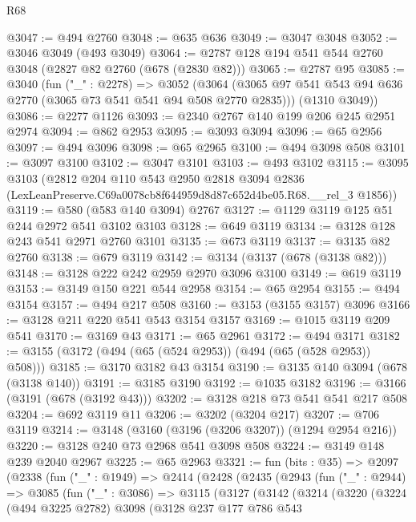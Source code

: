 \begin{lexlean}{R68}
\begin{coremodule}
@3047 := @494 @2760
@3048 := @635 @636
@3049 := @3047 @3048
@3052 := @3046 @3049 (@493 @3049)
@3064 := @2787 @128 @194 @541 @544 @2760 @3048 (@2827 @82 @2760 (@678 (@2830 @82)))
@3065 := @2787 @95
@3085 := @3040
    (fun ("_" : @2278) =>
    @3052
      (@3064 (@3065 @97 @541 @543 @94 @636 @2770 (@3065 @73 @541 @541 @94 @508 @2770 @2835)))
      (@1310 @3049))
@3086 := @2277 @1126
@3093 := @2340 @2767 @140 @199 @206 @245 @2951 @2974
@3094 := @862 @2953
@3095 := @3093 @3094
@3096 := @65 @2956
@3097 := @494 @3096
@3098 := @65 @2965
@3100 := @494 @3098 @508
@3101 := @3097 @3100
@3102 := @3047 @3101
@3103 := @493 @3102
@3115 := @3095
    @3103
    (@2812
      @204
      @110
      @543
      @2950
      @2818
      @3094
      @2836
      (LexLeanPreserve.C69a0078cb8f644959d8d87c652d4be05.R68.__rel_3 @1856))
@3119 := @580 (@583 @140 @3094) @2767
@3127 := @1129 @3119 @125 @51 @244 @2972 @541 @3102 @3103
@3128 := @649 @3119
@3134 := @3128 @128 @243 @541 @2971 @2760 @3101
@3135 := @673 @3119
@3137 := @3135 @82 @2760
@3138 := @679 @3119
@3142 := @3134 (@3137 (@678 (@3138 @82)))
@3148 := @3128 @222 @242 @2959 @2970 @3096 @3100
@3149 := @619 @3119
@3153 := @3149 @150 @221 @544 @2958
@3154 := @65 @2954
@3155 := @494 @3154
@3157 := @494 @217 @508
@3160 := @3153 (@3155 @3157) @3096
@3166 := @3128 @211 @220 @541 @543 @3154 @3157
@3169 := @1015 @3119 @209 @541
@3170 := @3169 @43
@3171 := @65 @2961
@3172 := @494 @3171
@3182 := @3155 (@3172 (@494 (@65 (@524 @2953)) (@494 (@65 (@528 @2953)) @508)))
@3185 := @3170 @3182 @43 @3154
@3190 := @3135 @140 @3094 (@678 (@3138 @140))
@3191 := @3185 @3190
@3192 := @1035 @3182
@3196 := @3166 (@3191 (@678 (@3192 @43)))
@3202 := @3128 @218 @73 @541 @541 @217 @508
@3204 := @692 @3119 @11
@3206 := @3202 (@3204 @217)
@3207 := @706 @3119
@3214 := @3148 (@3160 (@3196 (@3206 @3207)) (@1294 @2954 @216))
@3220 := @3128 @240 @73 @2968 @541 @3098 @508
@3224 := @3149 @148 @239 @2040 @2967
@3225 := @65 @2963
@3321 := fun (bits : @35) =>
  @2097
    (@2338
      (fun ("_" : @1949) =>
      @2414
        (@2428
          (@2435
            (@2943
              (fun ("_" : @2944) =>
              @3085
                (fun ("_" : @3086) =>
                @3115
                  (@3127
                    (@3142
                      (@3214
                        (@3220
                          (@3224
                            (@494 @3225 @2782)
                            @3098
                            (@3128
                              @237
                              @177
                              @786
                              @543

\end{coremodule}
\end{lexlean}
